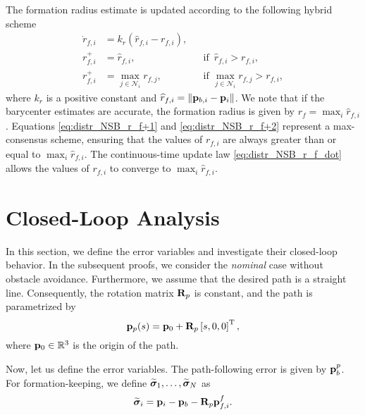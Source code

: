 The formation radius estimate is updated according to the following hybrid scheme
\begin{subequations}
    \begin{align}
        \dot{r}_{f, i} &= k_r \left(\widehat{r}_{f, i} - r_{f, i}\right),& &  \label{eq:distr_NSB_r_f_dot} \\
        r_{f, i}^{+} &= \widehat{r}_{f, i}, & &\text{if }\, \widehat{r}_{f, i} > r_{f, i}, \label{eq:distr_NSB_r_f+1} \\
        r_{f, i}^{+} &= \max_{j \in \mathcal{N}_i} r_{f, j}, & &\text{if } \max_{j \in \mathcal{N}_i} r_{f, j} > r_{f, i}, \label{eq:distr_NSB_r_f+2}
    \end{align}
\end{subequations}
where $k_r$ is a positive constant and $\widehat{r}_{f, i} = \left\|\mathbf{p}_{b, i} - \mathbf{p}_i\right\|$.
We note that if the barycenter estimates are accurate, the formation radius is given by $r_f = \max_i \widehat{r}_{f, i}$.
Equations \eqref{eq:distr_NSB_r_f+1} and \eqref{eq:distr_NSB_r_f+2} represent a max-consensus scheme, ensuring that the values of $r_{f, i}$ are always greater than or equal to $\max_i \widehat{r}_{f, i}$.
The continuous-time update law \eqref{eq:distr_NSB_r_f_dot} allows the values of $r_{f, i}$ to converge to $\max_i \widehat{r}_{f, i}$.

\section{Closed-Loop Analysis}
\label{sec:distr_NSB_closed_loop}
In this section, we define the error variables and investigate their closed-loop behavior.
In the subsequent proofs, we consider the \emph{nominal} case without obstacle avoidance.
Furthermore, we assume that the desired path is a straight line. %
Consequently, the rotation matrix $\mathbf{R}_p$ is constant, and the path is parametrized by
\begin{equation}
    \mathbf{p}_p(s) = \mathbf{p}_0 + \mathbf{R}_p \left[s, 0, 0\right]^{\mathrm{T}},
    \label{eq:distr_NSB_straight_line}
\end{equation}
where $\mathbf{p}_0 \in \mathbb{R}^3$ is the origin of the path.

Now, let us define the error variables.
The path-following error is given by $\mathbf{p}_b^p$.
For formation-keeping, we define $\widetilde{\bm{\sigma}}_1, \ldots, \widetilde{\bm{\sigma}}_N$ as
\begin{equation}
    \widetilde{\bm{\sigma}}_i = \mathbf{p}_i - \mathbf{p}_b - \mathbf{R}_p \mathbf{p}_{f, i}^f.
    \label{eq:distr_NSB_formation_errors}
\end{equation}    

